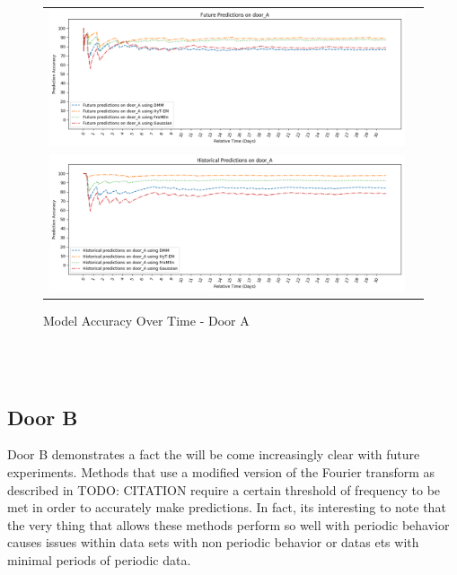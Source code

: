 \begin{center}
\begin{figure}[!Hp]
  \begin{tabular}{cc}
    {\includegraphics[width = 6in]{images/results/Future_Predictions_on_door_A.png}} \\
    {\includegraphics[width = 6in]{images/results/Historical_Predictions_on_door_A.png}} \\
  \end{tabular}
  \caption{Model Accuracy Over Time - Door A}
  \label{figure:accuracy_door_A}
\end{figure} \\ \\
\end{center}

\subsection { Door B }

Door B demonstrates a fact the will be come increasingly clear with future
experiments.  Methods that use a modified version of the Fourier transform as
described in TODO: CITATION require a certain threshold of frequency to be met
in order to accurately make predictions.  In fact, its interesting to note that the
very thing that allows these methods perform so well with periodic behavior
causes issues within data sets with non periodic behavior or datas ets with
minimal periods of periodic data. \\

